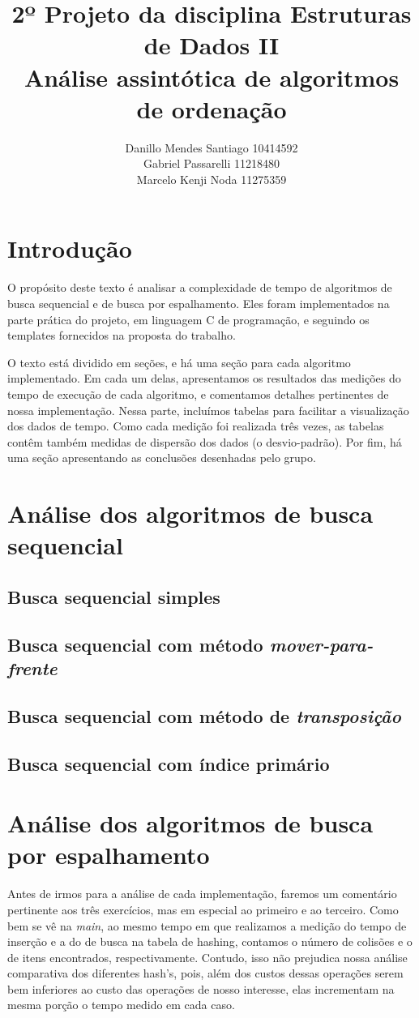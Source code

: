 \documentclass{article}
\title{%
    2º Projeto da disciplina Estruturas de Dados II \\
     \large Análise assintótica de algoritmos de ordenação}
\author{Danillo Mendes Santiago 10414592\\Gabriel Passarelli 11218480\\ Marcelo Kenji Noda 11275359}
\begin{document}
%
\maketitle
%
\section{Introdução}
O propósito deste texto é analisar a complexidade de tempo de algoritmos de busca sequencial e de busca por espalhamento. Eles foram implementados na parte prática do projeto, em linguagem C de programação, e seguindo os templates fornecidos na proposta do trabalho.\par
%
O texto está dividido em seções, e há uma seção para cada algoritmo implementado. Em cada um delas, apresentamos os resultados das medições do tempo de execução de cada algoritmo, e comentamos detalhes pertinentes de nossa implementação. Nessa parte, incluímos tabelas para facilitar a visualização dos dados de tempo. Como cada medição foi realizada três vezes, as tabelas contêm também medidas de dispersão dos dados (o desvio-padrão). Por fim, há uma seção apresentando as conclusões desenhadas pelo grupo.
%
\section{Análise dos algoritmos de busca sequencial}
\subsection{Busca sequencial simples}
%
%
%
\subsection{Busca sequencial com método \textit{mover-para-frente}}
%
%
%
\subsection{Busca sequencial com método de \textit{transposição}}
%
%
%
\subsection{Busca sequencial com índice primário}
%
%
%
\section{Análise dos algoritmos de busca por espalhamento}
Antes de irmos para a análise de cada implementação, faremos um comentário pertinente aos três exercícios, mas em especial ao primeiro e ao terceiro. Como bem se vê na \textit{main}, ao mesmo tempo em que realizamos a medição do tempo de inserção e a do de busca na tabela de hashing, contamos o número de colisões e o de itens encontrados, respectivamente. Contudo, isso não prejudica nossa análise comparativa dos diferentes hash's, pois, além dos custos dessas operações serem bem inferiores ao custo das operações de nosso interesse, elas incrementam na mesma porção o tempo medido em cada caso.
\end{document}

